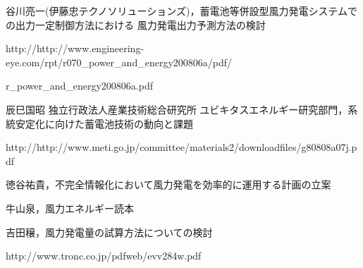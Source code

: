 \documentclass[a4paper,12pt,showkeys]{jreport}
\begin{document}
\begin{thebibliography}{17}
谷川亮一(伊藤忠テクノソリューションズ)，蓄電池等併設型風力発電システムでの出力一定制御方法における
風力発電出力予測方法の検討

http://http://www.engineering-eye.com/rpt/r070\_power\_and\_energy200806a/pdf/

r\_power\_and\_energy200806a.pdf

辰巳国昭 独立行政法人産業技術総合研究所 ユビキタスエネルギー研究部門，系統安定化に向けた蓄電池技術の動向と課題

http://http://www.meti.go.jp/committee/materials2/downloadfiles/g80808a07j.pdf


徳谷祐貴，不完全情報化において風力発電を効率的に運用する計画の立案

牛山泉，風力エネルギー読本

吉田穣，風力発電量の試算方法についての検討

http://www.tronc.co.jp/pdfweb/evv284w.pdf

\end{thebibliography}



%
\end{document}
